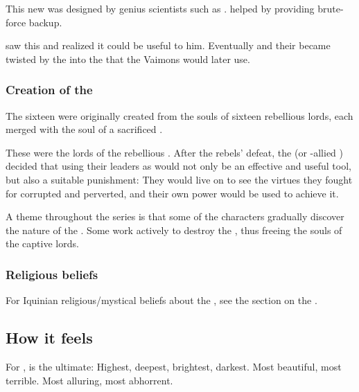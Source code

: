 This new \iquin{} was designed by genius scientists such as . 
 helped by providing brute-force backup.  

 saw this \dweomer{} and realized it could be useful to him. 
Eventually  and their \iquin{} became twisted by the \sephiroth{} into the \iquin{} that the Vaimons would later use. 





\subsubsection{Creation of the \sephiroth}
The sixteen \Sephiroth{} were originally created from the souls of sixteen rebellious \resphan{} lords, each merged with the soul of a sacrificed \banelord. 

These \resphain{} were the lords of the rebellious \Kezeradi. After the rebels' defeat, the \banes{} (or \bane-allied \resphain) decided that using their leaders as \Sephiroth{} would not only be an effective and useful tool, but also a suitable punishment: They would live on to see the virtues they fought for corrupted and perverted, and their own power would be used to achieve it. 

A theme throughout the series is that some of the characters gradually discover the nature of the \sephiroth. 
Some work actively to destroy the \sephiroth, thus freeing the souls of the captive \Kezeradi{} lords. 





\subsubsection{Religious beliefs}
For Iquinian religious/mystical beliefs about the \sephiroth, see the section on the . 









\subsection{How it feels}
For \humans{}, \iquin{} is the ultimate: 
Highest, deepest, brightest, darkest.
Most beautiful, most terrible. 
Most alluring, most abhorrent. 

